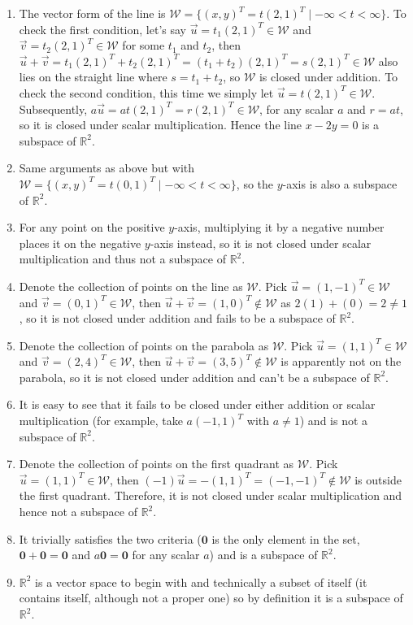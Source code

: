 \begin{solution}
\begin{enumerate}[label=(\alph*)]
\item The vector form of the line is $\mathcal{W} = \{(x,y)^T = t(2,1)^T \mid -\infty < t < \infty\}$. To check the first condition, let's say $\vec{u} = t_1(2,1)^T \in \mathcal{W}$ and $\vec{v} = t_2(2,1)^T \in \mathcal{W}$ for some $t_1$ and $t_2$, then $\vec{u} + \vec{v} = t_1(2,1)^T + t_2(2,1)^T = (t_1 + t_2)(2,1)^T = s(2,1)^T \in \mathcal{W}$ also lies on the straight line where $s = t_1 + t_2$, so $\mathcal{W}$ is closed under addition. To check the second condition, this time we simply let $\vec{u} = t(2,1)^T \in \mathcal{W}$. Subsequently, $a\vec{u} = at(2,1)^T = r(2,1)^T \in \mathcal{W}$, for any scalar $a$ and $r = at$, so it is closed under scalar multiplication. Hence the line $x-2y = 0$ is a subspace of $\mathbb{R}^2$.
\item Same arguments as above but with $\mathcal{W} = \{(x,y)^T = t(0,1)^T \mid -\infty < t < \infty\}$, so the $y$-axis is also a subspace of $\mathbb{R}^2$.
\item For any point on the positive $y$-axis, multiplying it by a negative number places it on the negative $y$-axis instead, so it is not closed under scalar multiplication and thus not a subspace of $\mathbb{R}^2$. 
\item Denote the collection of points on the line as $\mathcal{W}$. Pick $\vec{u} = (1, -1)^T \in \mathcal{W}$ and $\vec{v} = (0, 1)^T \in \mathcal{W}$, then $\vec{u} + \vec{v} = (1, 0)^T \notin \mathcal{W}$ as $2(1) + (0) = 2 \neq 1$, so it is not closed under addition and fails to be a subspace of $\mathbb{R}^2$.
\item Denote the collection of points on the parabola as $\mathcal{W}$. Pick $\vec{u} = (1,1)^T \in \mathcal{W}$ and $\vec{v} = (2,4)^T \in \mathcal{W}$, then $\vec{u} + \vec{v} = (3,5)^T \notin \mathcal{W}$ is apparently not on the parabola, so it is not closed under addition and can't be a subspace of $\mathbb{R}^2$.
\item It is easy to see that it fails to be closed under either addition or scalar multiplication (for example, take $a(-1,1)^T$ with $a\neq 1$) and is not a subspace of $\mathbb{R}^2$.
\item Denote the collection of points on the first quadrant as $\mathcal{W}$. Pick $\vec{u} = (1,1)^T \in \mathcal{W}$, then $(-1)\vec{u} = -(1,1)^T = (-1,-1)^T \notin \mathcal{W}$ is outside the first quadrant. Therefore, it is not closed under scalar multiplication and hence not a subspace of $\mathbb{R}^2$.
\item It trivially satisfies the two criteria ($\textbf{0}$ is the only element in the set, $\textbf{0} + \textbf{0} = \textbf{0}$ and $a\textbf{0} = \textbf{0}$ for any scalar $a$) and is a subspace of $\mathbb{R}^2$.
\item $\mathbb{R}^2$ is a vector space to begin with and technically a subset of itself (it contains itself, although not a proper one) so by definition it is a subspace of $\mathbb{R}^2$.
\end{enumerate}
\end{solution}
